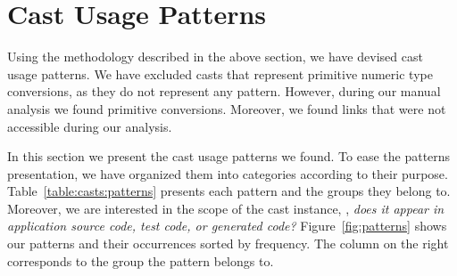 
\newcommand{\castpatternsection}[1]{\noindent\textbf{#1.}}
\newcommand{\pname}[1]{\textsc{#1}}
\newcommand{\group}[1]{

\

\

{\noindent\Large\textsc{#1} Patterns}

\

\begin{figure}[ht!]
\centering
\texttt{[image: "analysis/table-patterns-5000-by-group-\#1"]}
\caption{#1 Cast Pattern Occurrences}
\label{fig:group-patterns:#1}
\end{figure}

}

\newenvironment{pattern}[1]{
	\newcommand{\desc}{\castpatternsection{Description}}
	\newcommand{\instances}{\castpatternsection{Instances}}
	\newcommand{\detection}{\castpatternsection{Detection}}
	\newcommand{\discussion}{\castpatternsection{Discussion}}
	\newcommand{\related}{\castpatternsection{Related Patterns}}
    \newcommand{\thisp}{\textsc{#1}}
    \subsection{\pname{#1}}
    \label{pat:#1}
	\desc
}{}


\section{Cast Usage Patterns}
\label{sec:casts:patterns}

Using the methodology described in the above section,
we have devised \npattern{} cast usage patterns.
We have excluded casts that represent primitive numeric type conversions,
as they do not represent any pattern.
However, during our manual analysis we found \nprim{} primitive conversions.
Moreover, we found \nbrokenlinks{} links that were not accessible during our analysis.

In this section we present the cast usage patterns we found.
To ease the patterns presentation,
we have organized them into \ngroup{} categories according to their purpose.
Table~\ref{table:casts:patterns} presents each pattern and the groups they belong to.
Moreover, we are interested in the scope of the cast instance,
\ie, \emph{does it appear in application source code, test code, or generated code?}
%
%
Figure~\ref{fig:patterns} shows our patterns and their occurrences sorted by frequency.
The column on the right corresponds to the group the pattern belongs to.

